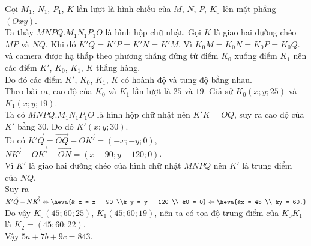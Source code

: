 \begin{ex}
{\begin{center}
\end{center}
Gọi $M_1$, $N_1$, $P_1$, $K$ lần lượt là hình chiếu của $M$, $N$, $P$, $K_0$ lên mặt phẳng $(Oxy)$.\\
Ta thấy $MNPQ.M_1N_1P_1O$ là hình hộp chữ nhật. Gọi $K$ là giao hai đường chéo $MP$ và $NQ$. Khi đó $K'Q = K'P = K'N = K'M$. Vì $K_0M = K_0N = K_0P = K_0Q$. và camera được hạ thấp theo phương thẳng đứng từ điểm $K_0$ xuống điểm $K_1$ nên các điểm $K'$, $K_0$, $K_1$, $K$ thẳng hàng.\\
Do đó các điểm $K'$, $K_0$, $K_1$, $K$ có hoành độ và tung độ bằng nhau.\\
Theo bài ra, cao độ của $K_0$ và $K_1$ lần lượt là $25$ và $19$. Giả sử $K_0(x;y;25)$ và $K_1(x;y;19)$.\\
Ta có $MNPQ.M_1N_1P_1O$ là hình hộp chữ nhật nên $K'K = OQ$, suy ra cao độ của $K'$ bằng $30$. Do đó $K'(x;y;30)$.\\
Ta có $\overrightarrow{K'Q} = \overrightarrow{OQ} - \overrightarrow{OK'} = (-x;-y;0)$, $\overrightarrow{NK'} - \overrightarrow{OK'} - \overrightarrow{ON} = (x - 90; y - 120; 0)$.\\
Vì $K'$ là giao hai đường chéo của hình chữ nhật $MNPQ$ nên $K'$ là trung điểm của $NQ$.\\
Suy ra $\overrightarrow{K'Q} - \overrightarrow{NK'} \Leftrightarrow \heva{&-x = x - 90 \\&-y = y - 120 \\ &0 = 0} \Leftrightarrow \heva{&x = 45 \\ &y = 60.}$\\
Do vậy $K_0(45;60;25)$, $K_1(45;60;19)$, nên ta có tọa độ trung điểm của $K_0 K_1$ là $K_2=(45;60;22)$.\\
Vậy $5a + 7b + 9c = 843$.
}
\end{ex}

